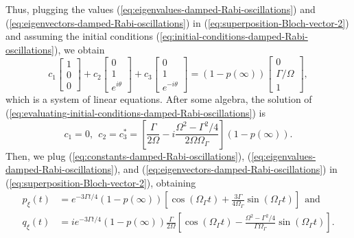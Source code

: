 {\begin{equation}
\end{equation}
Thus, plugging the values (\ref{eq:eigenvalues-damped-Rabi-oscillations}) and (\ref{eq:eigenvectors-damped-Rabi-oscillations}) in (\ref{eq:superposition-Bloch-vector-2}) and assuming the initial conditions (\ref{eq:initial-conditions-damped-Rabi-oscillations}), we obtain
\begin{equation}
	c_1 \left[ \begin{matrix} 1 \\ 0 \\ 0 \end{matrix} \right] + c_2 \left[ \begin{matrix} 0 \\ 1 \\ e^{i\theta} \end{matrix} \right] + c_3 \left[ \begin{matrix} 0 \\ 1 \\ e^{-i\theta} \end{matrix} \right] = (1 - p(\infty)) \left[ \begin{matrix} 0 \\ \Gamma / \Omega \\ 1 \end{matrix} \right],
	\label{eq:evaluating-initial-conditions-damped-Rabi-oscillations}
\end{equation} 
which is a system of linear equations. After some algebra, the solution of (\ref{eq:evaluating-initial-conditions-damped-Rabi-oscillations}) is
\begin{equation}
	c_1 = 0,\ \ c_2 = c_3^* = \left[ \frac{\Gamma}{2\Omega} - i \frac{\Omega^2 - \Gamma^2 / 4}{2 \Omega \Omega_{\Gamma}} \right](1 - p(\infty)).
	\label{eq:constants-damped-Rabi-oscillations}
\end{equation}
Then, we plug (\ref{eq:constants-damped-Rabi-oscillations}), (\ref{eq:eigenvalues-damped-Rabi-oscillations}), and (\ref{eq:eigenvectors-damped-Rabi-oscillations}) in (\ref{eq:superposition-Bloch-vector-2}), obtaining
\begin{align}
	p_{\xi}(t) &= e^{-3\Gamma t / 4}(1 - p(\infty))\left[\cos(\Omega_{\Gamma}t) + \frac{3\Gamma}{4 \Omega_{\Gamma}} \sin(\Omega_{\Gamma}t) \right]\ \ \textrm{and}
	\label{eq:xi-population-inversion-damped-Rabi-oscilations}
	\\
	q_{\xi}(t) &= ie^{-3\Gamma t / 4} (1 - p(\infty)) \frac{\Gamma}{2\Omega} \left[\cos(\Omega_{\Gamma}t) - \frac{\Omega^2 - \Gamma^2 / 4}{\Gamma \Omega_{\Gamma}} \sin(\Omega_{\Gamma}t) \right].

\end{align}}
